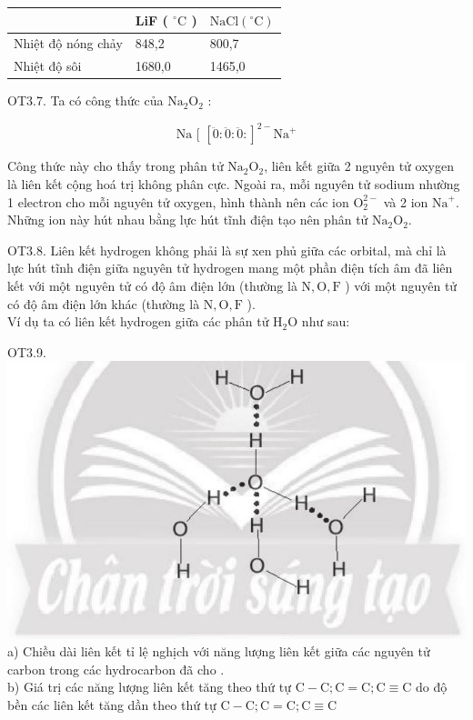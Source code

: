 \documentclass[10pt]{article}
\begin{document}
\begin{center}
\begin{tabular}{|l|l|l|}
\hline
 & LiF ( ${ }^{\circ} \mathrm{C}$ ) & $\mathrm{NaCl}\left({ }^{\circ} \mathrm{C}\right)$ \\
\hline
Nhiệt độ nóng chảy & 848,2 & 800,7 \\
\hline
Nhiệt độ sôi & 1680,0 & 1465,0 \\
\hline
\end{tabular}
\end{center}

OT3.7. Ta có công thức của $\mathrm{Na}_{2} \mathrm{O}_{2}$ :

$$
\mathrm{Na} \text { [ }[\ddot{0}: \ddot{0}: \ddot{0}:]^{2-} \mathrm{Na}^{+}
$$

Công thức này cho thấy trong phân tử $\mathrm{Na}_{2} \mathrm{O}_{2}$, liên kết giữa 2 nguyên tử oxygen là liên kết cộng hoá trị không phân cực. Ngoài ra, mỗi nguyên tử sodium nhường 1 electron cho mỗi nguyên tử oxygen, hình thành nên các ion $\mathrm{O}_{2}^{2-}$ và 2 ion $\mathrm{Na}^{+}$. Những ion này hút nhau bằng lực hút tĩnh điện tạo nên phân tử $\mathrm{Na}_{2} \mathrm{O}_{2}$.

OT3.8. Liên kết hydrogen không phải là sự xen phủ giữa các orbital, mà chỉ là lực hút tĩnh điện giữa nguyên tử hydrogen mang một phần điện tích âm đã liên kết với một nguyên tử có độ âm điện lớn (thường là $\mathrm{N}, \mathrm{O}, \mathrm{F}$ ) với một nguyên tử có độ âm điện lớn khác (thường là $\mathrm{N}, \mathrm{O}, \mathrm{F}$ ).\\
Ví dụ ta có liên kết hydrogen giữa các phân tử $\mathrm{H}_{2} \mathrm{O}$ như sau:

OT3.9.\\
\includegraphics[max width=\textwidth, center]{2025_10_23_57761e23b8c46a11c3efg-33}\\
a) Chiều dài liên kết tỉ lệ nghịch với năng lượng liên kết giữa các nguyên tử carbon trong các hydrocarbon đã cho .\\
b) Giá trị các năng lượng liên kết tăng theo thứ tự $\mathrm{C}-\mathrm{C} ; \mathrm{C}=\mathrm{C} ; \mathrm{C} \equiv \mathrm{C}$ do độ bền các liên kết tăng dần theo thứ tự $\mathrm{C}-\mathrm{C} ; \mathrm{C}=\mathrm{C} ; \mathrm{C} \equiv \mathrm{C}$
\end{document}
